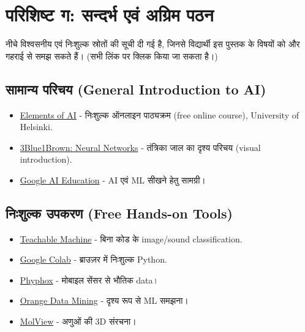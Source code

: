 \chapter*{परिशिष्ट ग: सन्दर्भ एवं अग्रिम पठन}

\noindent नीचे विश्वसनीय एवं निःशुल्क स्रोतों की सूची दी गई है, जिनसे विद्यार्थी इस
पुस्तक के विषयों को और गहराई से समझ सकते हैं। (सभी लिंक पर क्लिक किया जा सकता है।)

\section*{सामान्य परिचय (General Introduction to AI)}
\begin{itemize}[leftmargin=1.4em]
  \item \href{https://www.elementsofai.com/}{Elements of AI} - निःशुल्क ऑनलाइन
        पाठ्यक्रम (free online course), University of Helsinki.
  \item \href{https://www.youtube.com/watch?v=aircAruvnKK}{3Blue1Brown: Neural
        Networks} - तंत्रिका जाल का दृश्य परिचय (visual introduction).
  \item \href{https://ai.google/education/}{Google AI Education} - AI एवं ML
        सीखने हेतु सामग्री।
\end{itemize}

\section*{निःशुल्क उपकरण (Free Hands-on Tools)}
\begin{itemize}[leftmargin=1.4em]
  \item \href{https://teachablemachine.withgoogle.com/}{Teachable Machine} -
        बिना कोड के image/sound classification.
  \item \href{https://colab.research.google.com/}{Google Colab} - ब्राउज़र में
        निःशुल्क Python.
  \item \href{https://phyphox.org/}{Phyphox} - मोबाइल सेंसर से भौतिक data।
  \item \href{https://orangedatamining.com/}{Orange Data Mining} - दृश्य रूप से
        ML समझना।
  \item \href{https://molview.org/}{MolView} - अणुओं की 3D संरचना।
\end{itemize}

